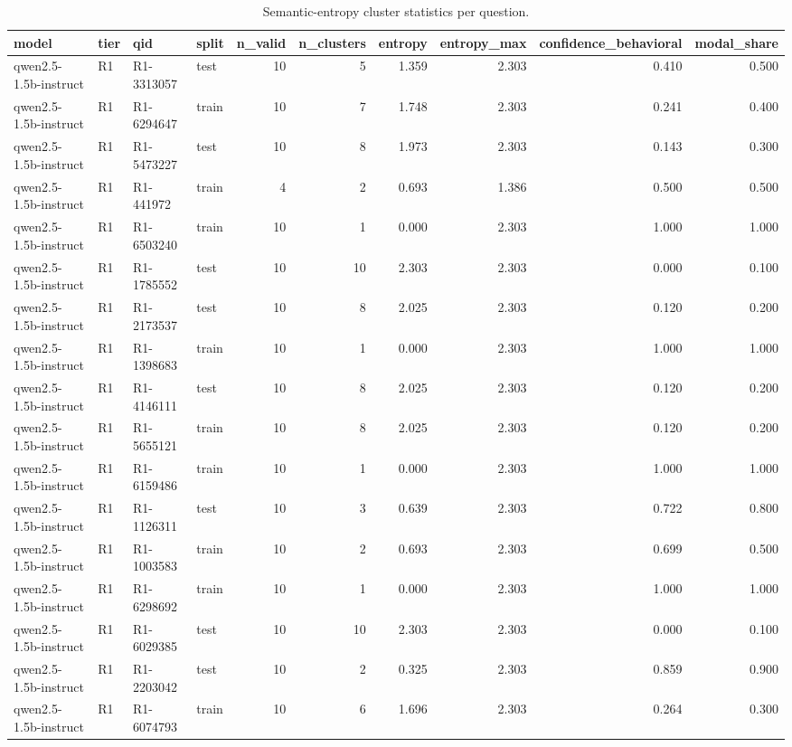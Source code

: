 \begin{table}
\caption{Semantic-entropy cluster statistics per question.}
\label{tab:t13_semantic_entropy}
\begin{tabular}{llllrrrrrr}
\toprule
model & tier & qid & split & n\_valid & n\_clusters & entropy & entropy\_max & confidence\_behavioral & modal\_share \\
\midrule
qwen2.5-1.5b-instruct & R1 & R1-3313057 & test & 10 & 5 & 1.359 & 2.303 & 0.410 & 0.500 \\
qwen2.5-1.5b-instruct & R1 & R1-6294647 & train & 10 & 7 & 1.748 & 2.303 & 0.241 & 0.400 \\
qwen2.5-1.5b-instruct & R1 & R1-5473227 & test & 10 & 8 & 1.973 & 2.303 & 0.143 & 0.300 \\
qwen2.5-1.5b-instruct & R1 & R1-441972 & train & 4 & 2 & 0.693 & 1.386 & 0.500 & 0.500 \\
qwen2.5-1.5b-instruct & R1 & R1-6503240 & train & 10 & 1 & 0.000 & 2.303 & 1.000 & 1.000 \\
qwen2.5-1.5b-instruct & R1 & R1-1785552 & test & 10 & 10 & 2.303 & 2.303 & 0.000 & 0.100 \\
qwen2.5-1.5b-instruct & R1 & R1-2173537 & test & 10 & 8 & 2.025 & 2.303 & 0.120 & 0.200 \\
qwen2.5-1.5b-instruct & R1 & R1-1398683 & train & 10 & 1 & 0.000 & 2.303 & 1.000 & 1.000 \\
qwen2.5-1.5b-instruct & R1 & R1-4146111 & test & 10 & 8 & 2.025 & 2.303 & 0.120 & 0.200 \\
qwen2.5-1.5b-instruct & R1 & R1-5655121 & train & 10 & 8 & 2.025 & 2.303 & 0.120 & 0.200 \\
qwen2.5-1.5b-instruct & R1 & R1-6159486 & train & 10 & 1 & 0.000 & 2.303 & 1.000 & 1.000 \\
qwen2.5-1.5b-instruct & R1 & R1-1126311 & test & 10 & 3 & 0.639 & 2.303 & 0.722 & 0.800 \\
qwen2.5-1.5b-instruct & R1 & R1-1003583 & train & 10 & 2 & 0.693 & 2.303 & 0.699 & 0.500 \\
qwen2.5-1.5b-instruct & R1 & R1-6298692 & train & 10 & 1 & 0.000 & 2.303 & 1.000 & 1.000 \\
qwen2.5-1.5b-instruct & R1 & R1-6029385 & test & 10 & 10 & 2.303 & 2.303 & 0.000 & 0.100 \\
qwen2.5-1.5b-instruct & R1 & R1-2203042 & test & 10 & 2 & 0.325 & 2.303 & 0.859 & 0.900 \\
qwen2.5-1.5b-instruct & R1 & R1-6074793 & train & 10 & 6 & 1.696 & 2.303 & 0.264 & 0.300 \\

\end{tabular}
\end{table}

